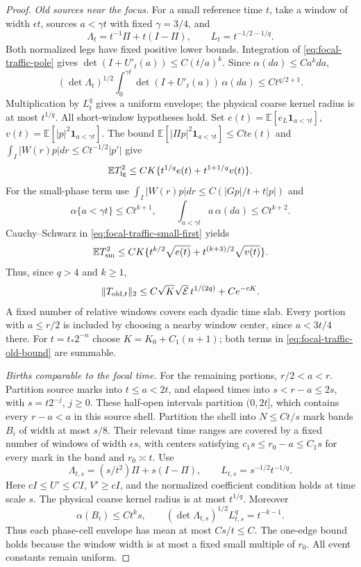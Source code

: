 \documentclass[11pt,reqno]{amsart}
\theoremstyle{definition}
\theoremstyle{remark}
\numberwithin{equation}{section}
\newcommand{\E}{\mathbb E}
\begin{document}
\begin{proof}
\emph{Old sources near the focus.}
For a small reference time $t$, take a window of width $\epsilon t$,
sources $a<\gamma t$ with fixed $\gamma=3/4$, and
\[
 \Lambda_t=t^{-1}\Pi+t(I-\Pi),\qquad L_t=t^{-1/2-1/q}.
\]
Both normalized legs have fixed positive lower bounds. Integration of
\eqref{eq:focal-traffic-pole} gives
$\det(I+U'_t(a))\le C(t/a)^k$. Since $\alpha(da)\le Ca^kda$,
\[
 (\det\Lambda_t)^{1/2}\int_0^{\gamma t}
       \det(I+U'_t(a))\,\alpha(da)\le Ct^{q/2+1}.
\]
Multiplication by $L_t^q$ gives a uniform envelope; the physical coarse
kernel radius is at most $t^{1/q}$. All short-window hypotheses hold.
Set $e(t)=\E[e_L\mathbf1_{a<\gamma t}]$,
$v(t)=\E[|p|^2\mathbf1_{a<\gamma t}]$.
The bound $\E[|\Pi p|^2\mathbf1_{a<\gamma t}]\le Ct e(t)$ and
$\int_I|W(r)p|dr\le Ct^{-1/2}|p'|$ give
\[
 \E T_{\rm lg}^2\le CK\{t^{1/q}e(t)+t^{1+1/q}v(t)\}.
\]
For the small-phase term use
$\int_I|W(r)p|dr\le C(|Gp|/t+t|p|)$ and
\[
 \alpha\{a<\gamma t\}\le Ct^{k+1},\qquad
 \int_{a<\gamma t}a\,\alpha(da)\le Ct^{k+2}.
\]
Cauchy--Schwarz in \eqref{eq:focal-traffic-small-first} yields
\[
 \E T_{\rm sm}^2\le CK\{t^{k/2}\sqrt{e(t)}
                              +t^{(k+3)/2}\sqrt{v(t)}\}.
\]
Thus, since $q>4$ and $k\ge1$,
\begin{equation}\label{eq:focal-traffic-old-bound}
 \|T_{{\rm old},t}\|_2
       \le C\sqrt K\sqrt{\mathcal E}\,t^{1/(2q)}+Ce^{-cK}.
\end{equation}
A fixed number of relative windows covers each dyadic time slab.
Every portion with $a\le r/2$ is included by choosing a nearby window
center, since $a<3t/4$ there. For $t=t_*2^{-n}$ choose
$K=K_0+C_1(n+1)$; both terms in \eqref{eq:focal-traffic-old-bound}
are summable.

\emph{Births comparable to the focal time.}
For the remaining portions, $r/2<a<r$. Partition source marks into
$t\le a<2t$, and elapsed times into $s<r-a\le2s$, with
$s=t2^{-j}$, $j\ge0$. These half-open intervals partition $(0,2t]$,
which contains every $r-a<a$ in this source shell. Partition the shell
into $N\le Ct/s$ mark bands $B_i$ of width at most $s/8$.
Their relevant time ranges are covered by a fixed number of windows
of width $\epsilon s$, with centers satisfying
$c_1s\le r_0-a\le C_1s$ for every mark in the band and $r_0\asymp t$.
Use
\[
 \Lambda_{t,s}=(s/t^2)\Pi+s(I-\Pi),\qquad
 L_{t,s}=s^{-1/2}t^{-1/q}.
\]
Here $cI\le U'\le CI$, $V'\ge cI$, and the normalized coefficient
condition holds at time scale $s$. The physical coarse kernel radius
is at most $t^{1/q}$. Moreover
\[
 \alpha(B_i)\le Ct^k s,\qquad
 (\det\Lambda_{t,s})^{1/2}L_{t,s}^q=t^{-k-1}.
\]
Thus each phase-cell envelope has mean at most $Cs/t\le C$.
The one-edge bound holds because the window width is at most a fixed
small multiple of $r_0$. All event constants remain uniform.


\end{proof}
\end{document}
